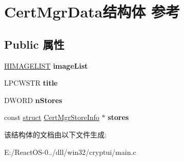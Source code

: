 \hypertarget{struct_cert_mgr_data}{}\section{Cert\+Mgr\+Data结构体 参考}
\label{struct_cert_mgr_data}
\subsection*{Public 属性}
\begin{DoxyCompactItemize}
\item 
\mbox{\label{struct_cert_mgr_data_a71339e6473c566914bfede9e13748280}} 
\hyperlink{struct___i_m_a_g_e_l_i_s_t}{H\+I\+M\+A\+G\+E\+L\+I\+ST} {\bfseries image\+List}
\item 
\mbox{\label{struct_cert_mgr_data_a4105574d93ed96c8aa44ee065be40526}} 
L\+P\+C\+W\+S\+TR {\bfseries title}
\item 
\mbox{\label{struct_cert_mgr_data_a38b70bb6e9d184a6320e503c66f50c60}} 
D\+W\+O\+RD {\bfseries n\+Stores}
\item 
\mbox{\label{struct_cert_mgr_data_a883d0c2aba8d786fc86296132f82efaa}} 
const \hyperlink{interfacestruct}{struct} \hyperlink{struct_cert_mgr_store_info}{Cert\+Mgr\+Store\+Info} $\ast$ {\bfseries stores}
\end{DoxyCompactItemize}


该结构体的文档由以下文件生成\+:\begin{DoxyCompactItemize}
\item 
E\+:/\+React\+O\+S-\/0../dll/win32/cryptui/main.\+c\end{DoxyCompactItemize}
